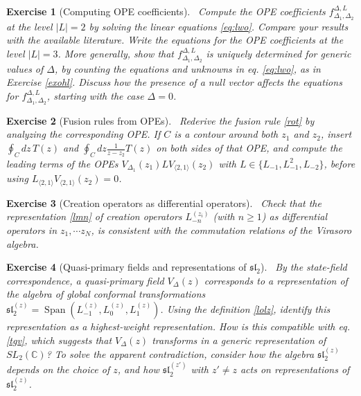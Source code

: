 \documentclass[12pt, a4paper, notitlepage, twoside]{report}
\numberwithin{equation}{section}
\theoremstyle{break}
\newtheorem{exo}{Exercise}[chapter]
\begin{document}
\begin{exo}[Computing OPE coefficients]
 ~\label{exohf}
Compute the OPE coefficients $f^{\Delta,L}_{\Delta_1,\Delta_2}$ at the level $|L|= 2$ by solving the linear equations \eqref{eq:lwo}.
Compare your results with the available literature.
Write the equations for the OPE coefficients at the level $|L|=3$. 
More generally, show that $f^{\Delta,L}_{\Delta_1,\Delta_2}$ is uniquely determined for generic values of $\Delta$, 
by counting the equations and unknowns in eq. \eqref{eq:lwo}, as in Exercise \ref{exohl}.
Discuss how the presence of a null vector affects the equations for $f^{\Delta,L}_{\Delta_1,\Delta_2}$, starting with the case $\Delta=0$. 
\end{exo}

\begin{exo}[Fusion rules from OPEs]
 ~\label{exooit}
Rederive the fusion rule \eqref{rot} by analyzing the corresponding OPE.
If $C$ is a contour around both $z_1$ and $z_2$, insert $\oint_C dz\, T(z)$ and $\oint_C dz \frac{1}{z-z_2}T(z)$ on both sides of that OPE, and compute the leading terms of the OPEs $V_{\Delta_1}(z_1) LV_{\langle 2,1 \rangle}(z_2)$ with $L\in\{L_{-1},L_{-1}^2,L_{-2}\}$, before using $L_{\langle 2,1 \rangle} V_{\langle 2,1 \rangle} (z_2) =0$. 
\end{exo}

\begin{exo}[Creation operators as differential operators]
 ~\label{exodma}
 Check that the representation \eqref{lmn} of creation operators $L_{-n}^{(z_i)}$ (with $n\geq 1$) as differential operators in $z_1,\cdots z_N$, is consistent with the commutation relations of the Virasoro algebra. 
\end{exo}

\begin{exo}[Quasi-primary fields and representations of $\mathfrak{sl}_2$]
 ~\label{exoqp}
By the state-field correspondence, a quasi-primary field $V_\Delta(z)$ corresponds to a representation of the algebra of global conformal transformations $\mathfrak{sl}_2^{(z)} = \operatorname{Span}(L_{-1}^{(z)},L_0^{(z)},L_1^{(z)})$.
Using the definition \eqref{lolz}, identify this representation as a highest-weight representation.
How is this compatible with eq. \eqref{tgv}, which suggests that $V_\Delta(z)$ transforms in a generic representation of $SL_2({\mathbb{C}})$? To solve the apparent contradiction, consider how the algebra $\mathfrak{sl}_2^{(z)}$ depends on the choice of $z$, and how $\mathfrak{sl}_2^{(z')}$ with $z'\neq z$ acts on representations of $\mathfrak{sl}_2^{(z)}$.
\end{exo}
\end{document}
